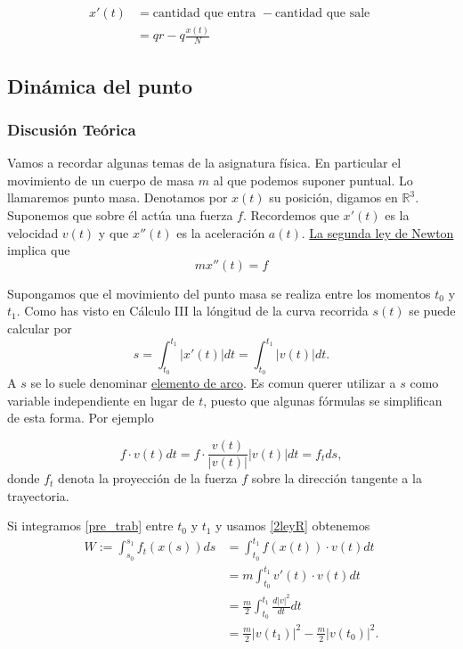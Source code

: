 \documentclass{article}
\newcommand{\rr}{\mathbb{R}}
\begin{document}
\[\begin{split}
   x'(t)&=\text{cantidad que entra }-\text{cantidad que sale }\\
          &=qr-q\frac{x(t)}{N}
  \end{split}
\]




\subsection{Dinámica del punto}

\subsubsection{Discusión Teórica}
Vamos a recordar algunas temas de la asignatura física. En particular  el movimiento de un cuerpo de masa $m$ al que podemos suponer puntual. Lo llamaremos punto masa. Denotamos por $x(t)$ su posición, digamos en $\rr^3$. Suponemos
que sobre él actúa una fuerza $f$. Recordemos que $x'(t)$ es la velocidad $v(t)$ y que $x''(t)$ es la aceleración $a(t)$.  
\href{http://es.wikipedia.org/wiki/Leyes_de_Newton\#Segunda_ley_de_Newton_o_ley_de_fuerza}{La segunda ley de Newton} implica que 
\begin{equation}\label{2leyR}\boxed{mx''(t)=f}\end{equation}


Supongamos que el movimiento del punto masa se realiza entre los momentos $t_0$ y $t_1$. Como has visto en Cálculo III la lóngitud de la curva recorrida 
$s(t)$ se puede calcular por
\begin{equation}\label{2ley}s=\int_{t_0}^{t_1}|x'(t)|dt=\int_{t_0}^{t_1}|v(t)|dt.\end{equation}
A $s$ se lo suele denominar \href{http://es.wikipedia.org/wiki/Longitud_de_arco}{elemento de arco}. Es comun querer utilizar a $s$ como variable independiente en 
lugar de $t$, puesto que algunas fórmulas se simplifican de esta forma. Por ejemplo

\begin{equation}\label{pre_trab} f\cdot v(t)dt=f\cdot\frac{v(t)}{|v(t)|}|v(t)|dt=f_tds,\end{equation}
donde $f_t$ denota la proyección de la fuerza $f$ sobre la dirección tangente a la trayectoria.





Si integramos \eqref{pre_trab} entre $t_0$ y $t_1$ y usamos \eqref{2leyR} obtenemos
\[\begin{split} W:=\int_{s_0}^{s_1}f_t(x(s))ds&=\int_{t_0}^{t_1} f(x(t))\cdot v(t)dt\\
   & =m \int_{t_0}^{t_1} v'(t)\cdot v(t)dt\\
   &=\frac{m}{2} \int_{t_0}^{t_1} \frac{d|v|^2}{dt}dt\\
   &=\frac{m}{2}|v(t_1)|^2-\frac{m}{2}|v(t_0)|^2.  \end{split}\]
\end{document}
